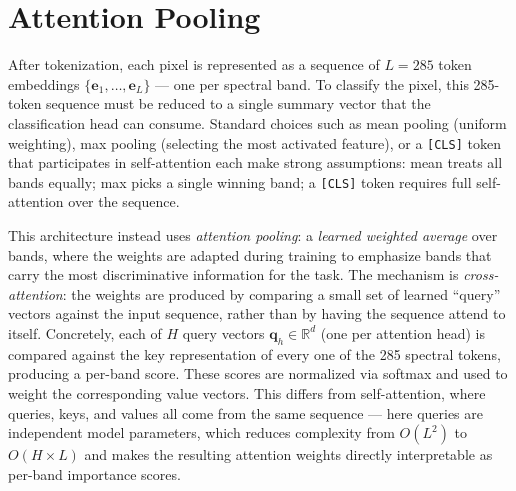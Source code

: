 \documentclass[11pt]{report}
\newcommand{\R}{\mathbb{R}}
\begin{document}
\section{Attention Pooling}
\label{sec:attn_pooling}

After tokenization, each pixel is represented as a sequence of $L = 285$ token embeddings $\{\mathbf{e}_1, \ldots, \mathbf{e}_L\}$ --- one per spectral band. To classify the pixel, this 285-token sequence must be reduced to a single summary vector that the classification head can consume. Standard choices such as mean pooling (uniform weighting), max pooling (selecting the most activated feature), or a \texttt{[CLS]} token that participates in self-attention each make strong assumptions: mean treats all bands equally; max picks a single winning band; a \texttt{[CLS]} token requires full self-attention over the sequence.

This architecture instead uses \emph{attention pooling}: a \emph{learned weighted average} over bands, where the weights are adapted during training to emphasize bands that carry the most discriminative information for the task. The mechanism is \emph{cross-attention}: the weights are produced by comparing a small set of learned ``query'' vectors against the input sequence, rather than by having the sequence attend to itself. Concretely, each of $H$ query vectors $\mathbf{q}_h \in \R^d$ (one per attention head) is compared against the key representation of every one of the 285 spectral tokens, producing a per-band score. These scores are normalized via softmax and used to weight the corresponding value vectors. This differs from self-attention, where queries, keys, and values all come from the same sequence --- here queries are independent model parameters, which reduces complexity from $O(L^2)$ to $O(H \times L)$ and makes the resulting attention weights directly interpretable as per-band importance scores.
\end{document}
